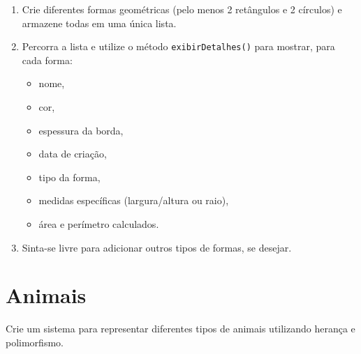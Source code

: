 \documentclass{article}
\begin{document}
\begin{enumerate}
\begin{enumerate}
                    Também deve possuir:
                    \begin{itemize}
                        \item Um método para calcular a \textbf{área}: \(\pi \times \text{raio}^2\),
                        \item Um método para calcular o \textbf{perímetro}: \(2 \times \pi \times \text{raio}\).
                    \end{itemize}
          \end{enumerate}

    \item Crie diferentes formas geométricas (pelo menos 2 retângulos e 2 círculos)
          e armazene todas em uma única lista.

    \item Percorra a lista e utilize o método \texttt{exibirDetalhes()} para mostrar, para cada forma:
          \begin{itemize}
              \item nome,
              \item cor,
              \item espessura da borda,
              \item data de criação,
              \item tipo da forma,
              \item medidas específicas (largura/altura ou raio),
              \item área e perímetro calculados.
          \end{itemize}

    \item Sinta-se livre para adicionar outros tipos de formas, se desejar.
\end{enumerate}

\section{Animais}

Crie um sistema para representar diferentes tipos de animais utilizando herança e polimorfismo.
\end{document}
